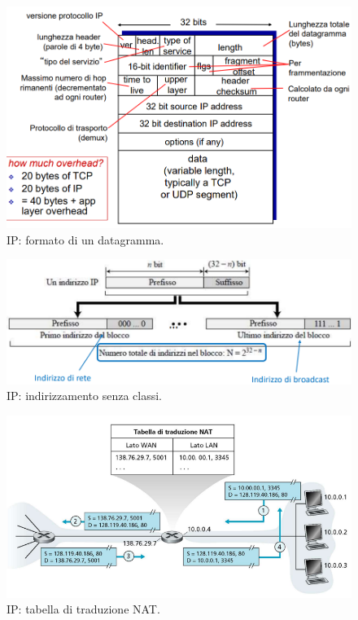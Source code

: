 \documentclass[11pt, italian, openany]{book}
\begin{document}
\begin{sloppypar}
\pagebreak

\begin{figure}[!h]
	\centering
	\includegraphics[scale=0.5]{images/ip-datagramma.png}
	\caption{IP: formato di un datagramma.}
	\label{fig:ip-datagramma}
\end{figure}

\begin{figure}[!h]
	\centering
	\includegraphics[scale=0.5]{images/ip-classless-addressing.png}
	\caption{IP: indirizzamento senza classi.}
	\label{fig:ip-classless-addressing}
\end{figure}

\pagebreak

\begin{figure}[!h]
	\centering
	\includegraphics[scale=0.5]{images/ip-tabella-nat.png}
	\caption{IP: tabella di traduzione NAT.}
	\label{fig:ip-nat}
\end{figure}


\end{sloppypar}
\end{document}
